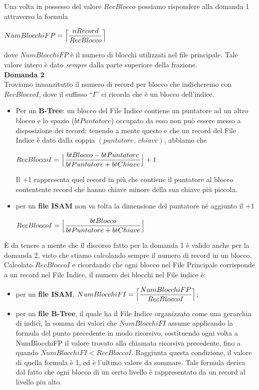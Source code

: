   Una volta in possesso del valore $RecBlocco$ possiamo rispondere alla domanda 1 attraverso la formula
  \begin{center}
   $NumBlocchiFP = \Bigl\lceil\dfrac{nRecord}{RecBlocco}\Bigr\rceil$
  \end{center}
  dove $NumBlocchiFP$ è il numero di blocchi utilizzati nel file principale. Tale valore intero è dato \emph{sempre} dalla parte 
  superiore della frazione.\\
  
  \noindent\textbf{\fontsize{14pt}{1em}Domanda 2}\\
  Troviamo innanzitutto il numero di record per blocco che indicheremo con $RecBloccoI$, dove il suffisso ``$I$''
  ci ricorda che è un blocco dell'indice. 
  \begin{itemize}
   \item Per un \textbf{B-Tree}: un blocco del File Indice contiene un puntatore ad un altro blocco
  e lo spazio ($btPuntatore$) occupato da esso non può essere messo a disposizione dei record; tenendo a mente questo e che un record
  del File Indice è dato dalla coppia $(puntatore,\ chiave)$, abbiamo che
  \begin{center}
   $RecBloccoI = \Bigl\lfloor \dfrac{btBlocco - btPuntatore}{btPuntatore + btChiave}\Bigr\rfloor + 1$
  \end{center}
  Il +1 rappresenta quel record in più che contiene il puntatore al blocco contentente record che hanno chiave
  minore della sua chiave più piccola.
  \item per un \textbf{file ISAM} non va tolta la dimensione del puntatore né aggiunto il +1
  \begin{center}
   $RecBloccoI = \Bigl\lfloor \dfrac{btBlocco}{btPuntatore + btChiave}\Bigr\rfloor$
  \end{center}
  \end{itemize}
\`E da tenere a mente 
  che il discorso fatto per la domanda 1 è valido anche per la domanda 2, visto che stiamo calcolando
  sempre il numero di record in un blocco.\\
  Calcolato $RecBloccoI$ e ricordando che ogni blocco nel File Principale corrisponde a un record nel File Indice, il numero 
  dei blocchi nel File indice è:
  \begin{itemize}
   \item per un \textbf{file ISAM}, $NumBlocchiFI = \Bigl\lceil \dfrac{NumBlocchiFP}{RecBloccoI}\Bigr\rceil$;
   \item per un \textbf{file B-Tree}, il quale ha il File Indice organizzato come una gerarchia di indici,
   la somma dei valori che $NumBlocchiFI$ assume applicando la formula del punto precedente
   in modo ricorsivo, sostituendo ogni volta a NumBlocchiFP il valore trovato alla chiamata ricorsiva precedente, fino a quando
   $NumBlocchiFI < RecBloccoI$. Raggiunta questa condizione, il valore di quella formula è 1, ed è l'ultimo valore da sommare.
   Tale formula deriva dal fatto che ogni blocco di un certo livello è rappresentato da un record al livello piu alto.
  \end{itemize}
  
